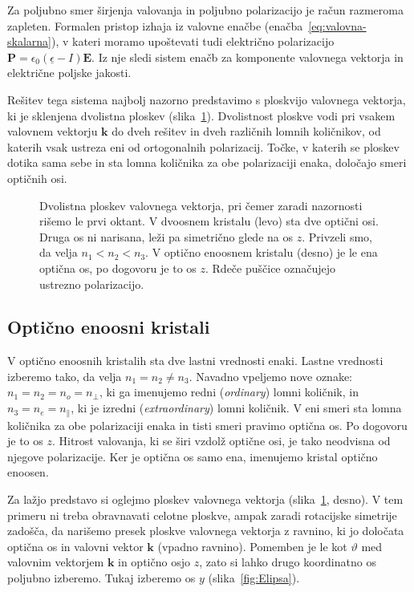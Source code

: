 Za poljubno smer širjenja valovanja in poljubno polarizacijo je račun razmeroma zapleten. 
Formalen pristop izhaja iz valovne enačbe (enačba~\ref{eq:valovna-skalarna}), v kateri
moramo upoštevati tudi električno polarizacijo 
$\mathbf{P} = \epsilon_{0}(\underline{\epsilon}-I)\mathbf{E}$. Iz nje sledi 
sistem enačb za komponente valovnega vektorja in električne poljske jakosti. 

Rešitev tega sistema najbolj nazorno predstavimo s ploskvijo valovnega vektorja, 
ki je sklenjena dvolistna ploskev (slika~\ref{kploskev}). Dvolistnost ploskve
vodi pri vsakem valovnem vektorju $\mathbf{k}$ do dveh rešitev in dveh različnih lomnih
količnikov, od katerih vsak ustreza eni od ortogonalnih polarizacij. Točke, v katerih
se ploskev dotika sama sebe in sta lomna količnika za obe polarizaciji enaka, 
določajo smeri optičnih osi. 
\begin{figure}[h]
\centering
\def\svgwidth{140truemm} 

\caption{Dvolistna ploskev valovnega vektorja, pri čemer zaradi nazornosti rišemo le prvi 
oktant. V dvoosnem kristalu (levo) sta dve optični osi. Druga os ni narisana, leži pa 
simetrično glede na os $z$. Privzeli smo, da velja $n_1<n_2<n_3$.
V optično enoosnem kristalu (desno) je le ena optična os, 
po dogovoru je to os $z$. Rdeče puščice označujejo ustrezno polarizacijo.}
\label{kploskev}
\end{figure}

\subsection*{Optično enoosni kristali}
V optično enoosnih kristalih sta dve lastni vrednosti enaki. Lastne vrednosti izberemo
tako, da velja $n_{1}=n_{2}\neq n_{3}$. Navadno vpeljemo nove 
oznake: $n_{1}=n_{2}=n_{o}=n_{\perp}$, ki ga imenujemo redni (\textit{ordinary})
lomni količnik, in $n_{3}=n_{e}=n_\parallel$, ki je izredni 
(\textit{extraordinary}) lomni količnik. 
V eni smeri sta lomna količnika za obe polarizaciji enaka in tisti smeri pravimo 
optična os. Po dogovoru je to os $z$. Hitrost valovanja, ki
se širi vzdolž optične osi, je tako neodvisna od njegove polarizacije.
Ker je optična os samo ena, imenujemo kristal optično enoosen. 

Za lažjo predstavo si oglejmo ploskev valovnega vektorja (slika~\ref{kploskev}, desno). 
V tem primeru ni treba obravnavati celotne ploskve, ampak zaradi rotacijske simetrije
zadošča, da narišemo presek ploskve valovnega vektorja z ravnino, ki jo določata 
optična os in valovni vektor $\mathbf{k}$ (vpadno ravnino). 
Pomemben je le kot $\vartheta$ med valovnim vektorjem $\mathbf{k}$ 
in optično osjo $z$, zato si lahko drugo koordinatno os poljubno izberemo. Tukaj izberemo
os $y$ (slika~\ref{fig:Elipsa}). 

